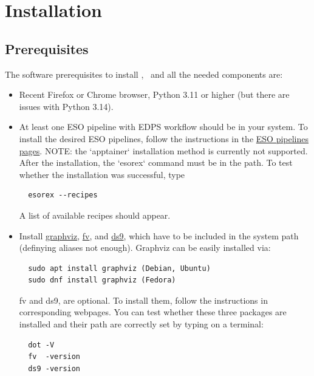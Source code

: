 \section{Installation}
\label{sec:installation}

\subsection{Prerequisites}

The software prerequisites to install \edps, \edpsgui\ and all the needed components are:

\begin{itemize}
\item Recent Firefox or Chrome browser, Python 3.11 or higher (but there are issues with Python 3.14).

\item At least one ESO pipeline with EDPS workflow should be in your
  system. To install the desired ESO pipelines, follow the
  instructions in the \href{http://eso.org/pipelines}{ESO pipelines
    pages}. NOTE: the `apptainer` installation method is currently not
  supported. After the installation, the `esorex` command must be in
  the path. To test whether the installation was successful, type

\begin{verbatim}
  esorex --recipes 
\end{verbatim}

A list of available recipes should appear.

\item Install \href{https://graphviz.org/}{graphviz},
  \href{https://heasarc.gsfc.nasa.gov/docs/software/ftools/fv/fv.html.5.0}{fv},
  and
  \href{https://sites.google.com/cfa.harvard.edu/saoimageds9/download}{ds9},
  which have to be included in the system path (definying aliases not
  enough). Graphviz can be easily installed via:

\begin{verbatim}
  sudo apt install graphviz (Debian, Ubuntu)
  sudo dnf install graphviz (Fedora)
\end{verbatim}

fv and ds9, are optional. To install them, follow the instructions in corresponding webpages.
   You can test whether these three packages are installed and their path are correctly set by typing on a terminal:

\begin{verbatim}
  dot -V
  fv  -version
  ds9 -version
\end{verbatim}
\end{itemize}

